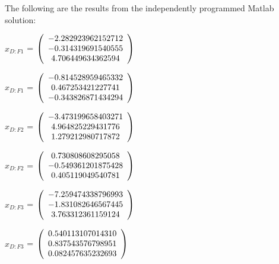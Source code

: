 \begin{description}
The following are the results from the independently programmed Matlab solution:

$x_{D:F1}$  = $\left( \begin{array} {ccc} -2.282923962152712 \\ -0.314319691540555 \\ 4.706449634362594
\end{array} \right)\\ \\$

$\hat{x}_{D:F1}$  = $\left( \begin{array} {ccc} -0.814528959465332 \\ 0.467253421227741 \\ -0.343826871434294
\end{array} \right)\\ \\$

$x_{D:F2}$  = $\left( \begin{array} {ccc} -3.473199658403271 \\ 4.964825229431776 \\ 1.279212980717872
\end{array} \right)\\ \\$

$\hat{x}_{D:F2}$  = $\left( \begin{array} {ccc} 0.730808608295058 \\ -0.549361201875428 \\ 0.405119049540781
\end{array} \right)\\ \\$

$x_{D:F3}$  = $\left( \begin{array} {ccc} -7.259474338796993 \\ -1.831082646567445 \\ 3.763312361159124
\end{array} \right)\\ \\$

$\hat{x}_{D:F3}$  = $\left( \begin{array} {ccc} 0.540113107014310 \\ 0.837543576798951 \\ 0.082457635232693
\end{array} \right)\\ \\$


\end{description}

